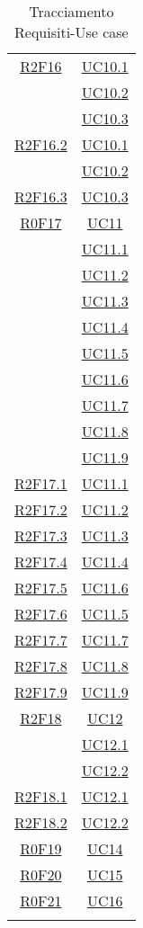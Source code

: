 \begin{longtable}{|c|c|}
\hline
\hyperlink{R2F16}{R2F16} & \hyperlink{UC10.1}{UC10.1}\\
& \hyperlink{UC10.2}{UC10.2}\\
& \hyperlink{UC10.3}{UC10.3}\\
\hline
\hyperlink{R2F16.2}{R2F16.2} & \hyperlink{UC10.1}{UC10.1}\\
& \hyperlink{UC10.2}{UC10.2}\\
\hline
\hyperlink{R2F16.3}{R2F16.3} & \hyperlink{UC10.3}{UC10.3}\\
\hline
\hyperlink{R0F17}{R0F17} & \hyperlink{UC11}{UC11}\\
& \hyperlink{UC11.1}{UC11.1}\\
& \hyperlink{UC11.2}{UC11.2}\\
& \hyperlink{UC11.3}{UC11.3}\\
& \hyperlink{UC11.4}{UC11.4}\\
& \hyperlink{UC11.5}{UC11.5}\\
& \hyperlink{UC11.6}{UC11.6}\\
& \hyperlink{UC11.7}{UC11.7}\\
& \hyperlink{UC11.8}{UC11.8}\\
& \hyperlink{UC11.9}{UC11.9}\\
\hline
\hyperlink{R2F17.1}{R2F17.1} & \hyperlink{UC11.1}{UC11.1}\\
\hline
\hyperlink{R2F17.2}{R2F17.2} & \hyperlink{UC11.2}{UC11.2}\\
\hline
\hyperlink{R2F17.3}{R2F17.3} & \hyperlink{UC11.3}{UC11.3}\\
\hline
\hyperlink{R2F17.4}{R2F17.4} & \hyperlink{UC11.4}{UC11.4}\\
\hline
\hyperlink{R2F17.5}{R2F17.5} & \hyperlink{UC11.6}{UC11.6}\\
\hline
\hyperlink{R2F17.6}{R2F17.6} & \hyperlink{UC11.5}{UC11.5}\\
\hline
\hyperlink{R2F17.7}{R2F17.7} & \hyperlink{UC11.7}{UC11.7}\\
\hline
\hyperlink{R2F17.8}{R2F17.8} & \hyperlink{UC11.8}{UC11.8}\\
\hline
\hyperlink{R2F17.9}{R2F17.9} & \hyperlink{UC11.9}{UC11.9}\\
\hline
\hyperlink{R2F18}{R2F18} & \hyperlink{UC12}{UC12}\\
& \hyperlink{UC12.1}{UC12.1}\\
& \hyperlink{UC12.2}{UC12.2}\\
\hline
\hyperlink{R2F18.1}{R2F18.1} & \hyperlink{UC12.1}{UC12.1}\\
\hline
\hyperlink{R2F18.2}{R2F18.2} & \hyperlink{UC12.2}{UC12.2}\\
\hline
\hyperlink{R0F19}{R0F19} & \hyperlink{UC14}{UC14}\\
\hline
\hyperlink{R0F20}{R0F20} & \hyperlink{UC15}{UC15}\\
\hline
\hyperlink{R0F21}{R0F21} & \hyperlink{UC16}{UC16}\\
\hline
\caption[Tracciamento Requisiti-Use case]{Tracciamento Requisiti-Use case}
\label{tabella:requi-usecase}
\end{longtable}
